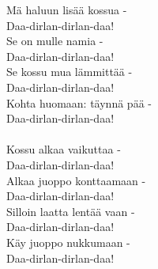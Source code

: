 
Mä haluun lisää kossua -\\
Daa-dirlan-dirlan-daa!\\
Se on mulle namia -\\
Daa-dirlan-dirlan-daa!\\
Se kossu mua lämmittää -\\
Daa-dirlan-dirlan-daa!\\
Kohta huomaan: täynnä pää -\\
Daa-dirlan-dirlan-daa!\\
\hspace{10mm}\\
Kossu alkaa vaikuttaa -\\
Daa-dirlan-dirlan-daa!\\
Alkaa juoppo konttaamaan -\\
Daa-dirlan-dirlan-daa!\\
Silloin laatta lentää vaan -\\
Daa-dirlan-dirlan-daa!\\
Käy juoppo nukkumaan -\\
Daa-dirlan-dirlan-daa!\\